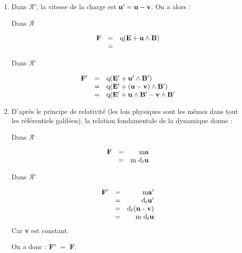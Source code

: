\begin{enumerate}
  \item Dans $\mathcal{R'}$, la vitesse de la charge est ${\bf u'} = {\bf u} - {\bf v}$. On a alors :

\hspace{1.5cm}
\begin{minipage}[c]{.45\linewidth}
\begin{center}
Dans $\mathcal{R}$
\end{center}
\[
\begin{array}{rcr}
{\bf F} & = & \text{q}({\bf E} + {\bf u} \land {\bf B}) \\
 & = & 
\end{array}
\]
\end{minipage}
\hfill
\begin{minipage}[c]{.45\linewidth}
\begin{center}
Dans $\mathcal{R}$'
\end{center}
\[
\begin{array}{rcl}
{\bf F'} & = & \text{q}({\bf E'} + {\bf u'} \land {\bf B'}) \\
 & = & \text{q}({\bf E'} + ({\bf u} - {\bf v})\land {\bf B'}) \\
 & = & \text{q}({\bf E'} + {\bf u}\land {\bf B'} - {\bf v}\land {\bf B'}
\end{array}
\]
\end{minipage}

  \item D'après le principe de relativité (les lois physiques sont les mêmes dans tout les référentiels galiléen), la relation fondamentale de la dynamique donne :

\hspace{1.5cm}
\begin{minipage}[c]{.45\linewidth}
\begin{center}
Dans $\mathcal{R}$
\end{center}
\[
\begin{array}{rcr}
{\bf F} & = & \text{m}{\bf a} \\
 & = & \text{m d}_t{\bf u}
\end{array}
\]
\end{minipage}
\hfill
\begin{minipage}[c]{.45\linewidth}
\begin{center}
Dans $\mathcal{R}$'
\end{center}
\[
\begin{array}{rcr}
{\bf F'} & = & \text{m}{\bf a'} \\
 & = & \text{d}_t{\bf u'} \\
 & = & \text{d}_t(${\bf u} - {\bf v}$) \\
 & = & \text{m d}_t{\bf u}
\end{array}
\]
Car {\bf v} est constant.
\end{minipage}
On a donc : {\bf F'} $=$ {\bf F}.


\end{enumerate}
